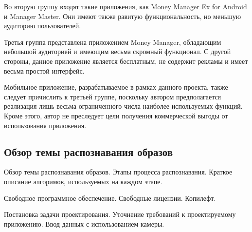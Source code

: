 Во вторую группу входят такие приложения, как
Money Manager Ex for Android и Manager Master.
Они имеют также равитую функциональность, но меньшую аудиторию пользователей.

Третья группа представлена приложением Money Manager,
обладающим небольшой аудиторией и имеющим весьма скромный функционал.
С другой стороны, данное приложение является бесплатным, не содержит рекламы
и имеет весьма простой интерфейс.

Мобильное приложение, разрабатываемое в рамках данного проекта,
также следует причислить к третьей группе,
поскольку автором предполагается реализация лишь весьма ограниченного числа
наиболее используемых функций.
Кроме этого, автор не преследует цели получения коммерческой выгоды
от использования приложения.




\subsection{Обзор темы распознавания образов}

Обзор темы распознавания образов.
Этапы процесса распознавания.
Краткое описание алгоримов, используемых на каждом этапе.

Свободное программное обеспечение. Свободные лицензии. Копилефт.

Постановка задачи проектирования.
Уточнение требований к проектируемому приложению. Ввод данных с использованием камеры.
